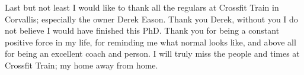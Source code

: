 Last but not least I would like to thank all the regulars at Crossfit Train in
Corvallis; especially the owner Derek Eason. Thank you Derek, without you I do
not believe I would have finished this PhD. Thank you for being a constant
positive force in my life, for reminding me what normal looks like, and above
all for being an excellent coach and person. I will truly miss the people and
times at Crossfit Train; my home away from home.


